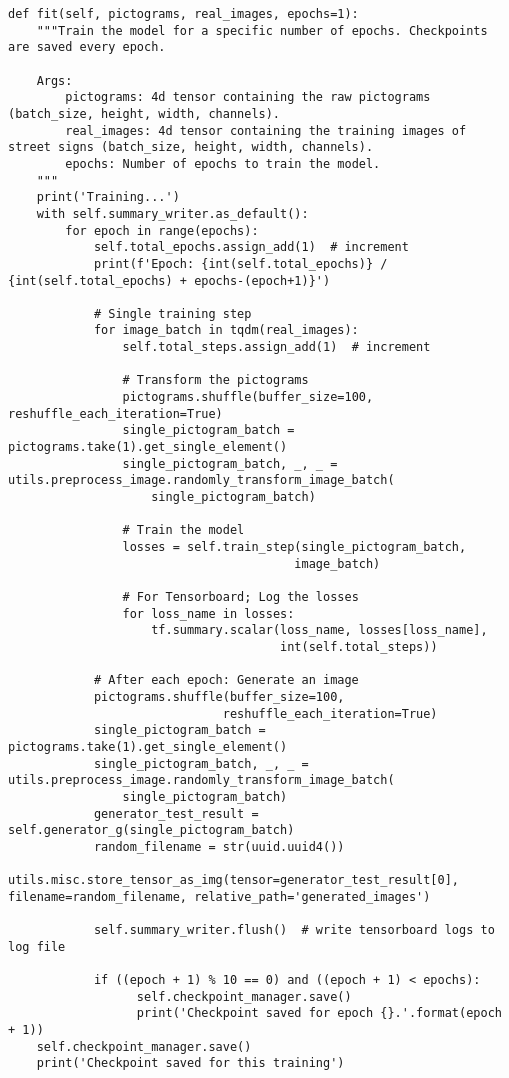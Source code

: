 \begin{code}
  \begin{verbatim}
def fit(self, pictograms, real_images, epochs=1):
    """Train the model for a specific number of epochs. Checkpoints are saved every epoch.

    Args:
        pictograms: 4d tensor containing the raw pictograms (batch_size, height, width, channels).
        real_images: 4d tensor containing the training images of street signs (batch_size, height, width, channels).
        epochs: Number of epochs to train the model.
    """
    print('Training...')
    with self.summary_writer.as_default():
        for epoch in range(epochs):
            self.total_epochs.assign_add(1)  # increment
            print(f'Epoch: {int(self.total_epochs)} / {int(self.total_epochs) + epochs-(epoch+1)}')

            # Single training step
            for image_batch in tqdm(real_images):
                self.total_steps.assign_add(1)  # increment

                # Transform the pictograms
                pictograms.shuffle(buffer_size=100, reshuffle_each_iteration=True)
                single_pictogram_batch = pictograms.take(1).get_single_element()
                single_pictogram_batch, _, _ = utils.preprocess_image.randomly_transform_image_batch(
                    single_pictogram_batch)

                # Train the model
                losses = self.train_step(single_pictogram_batch, 
                                        image_batch)

                # For Tensorboard; Log the losses
                for loss_name in losses:
                    tf.summary.scalar(loss_name, losses[loss_name], 
                                      int(self.total_steps))

            # After each epoch: Generate an image
            pictograms.shuffle(buffer_size=100, 
                              reshuffle_each_iteration=True)
            single_pictogram_batch = pictograms.take(1).get_single_element()
            single_pictogram_batch, _, _ = utils.preprocess_image.randomly_transform_image_batch(
                single_pictogram_batch)
            generator_test_result = self.generator_g(single_pictogram_batch)
            random_filename = str(uuid.uuid4())
            utils.misc.store_tensor_as_img(tensor=generator_test_result[0], filename=random_filename, relative_path='generated_images')
            
            self.summary_writer.flush()  # write tensorboard logs to log file

            if ((epoch + 1) % 10 == 0) and ((epoch + 1) < epochs):
                  self.checkpoint_manager.save()
                  print('Checkpoint saved for epoch {}.'.format(epoch + 1))
    self.checkpoint_manager.save()
    print('Checkpoint saved for this training')
    
\end{verbatim}
  \label{lst:fit-full}
  \end{code}

